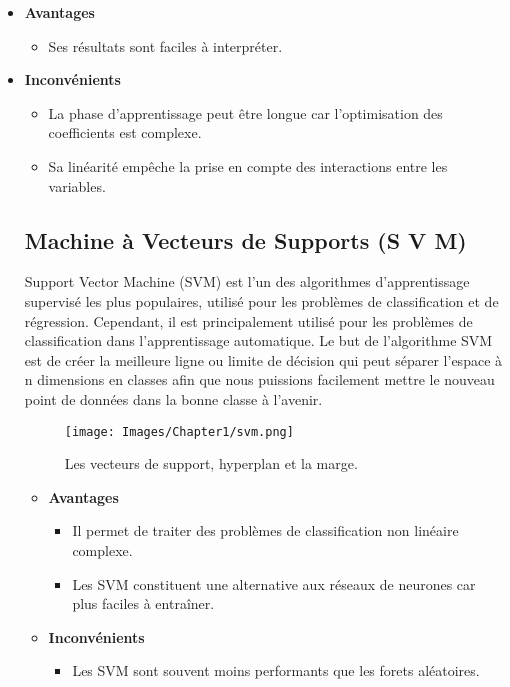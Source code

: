     \begin{itemize}
        \item \textbf{Avantages}
        \begin{itemize}
            \item Ses résultats sont faciles à interpréter.
        \end{itemize}
        \item \textbf{Inconvénients}
        \begin{itemize}
            \item La phase d’apprentissage peut être longue car l’optimisation des coefficients est complexe.
            \item Sa linéarité empêche la prise en compte des interactions entre les variables.
        \end{itemize}
        \subsection{Machine à Vecteurs de Supports (S V M)}
        Support Vector Machine (SVM) est l’un des algorithmes d’apprentissage supervisé les plus populaires, utilisé pour les problèmes de classification et de régression. 
        Cependant, il est principalement utilisé pour les problèmes de classification dans l’apprentissage automatique. Le but de l’algorithme SVM est de créer la meilleure ligne ou limite de décision qui peut séparer l’espace à n dimensions en classes afin que nous puissions facilement mettre le nouveau point de données dans la bonne classe à l’avenir.
        
        \begin{figure}[h]
            \centering
            \texttt{[image: Images/Chapter1/svm.png]}
            \caption{Les vecteurs de support, hyperplan et la marge.}
            \label{fig:05}
            \end{figure} 
            \begin{itemize}
                \item \textbf{Avantages}
                \begin{itemize}
                    \item Il permet de traiter des problèmes de classification non linéaire complexe.
                    \item Les SVM constituent une alternative aux réseaux de neurones car plus faciles à entraîner.
                \end{itemize}
                \item \textbf{Inconvénients}
                \begin{itemize}
                    \item Les SVM sont souvent moins performants que les forets aléatoires.
                \end{itemize}

\end{itemize}
\end{itemize}
